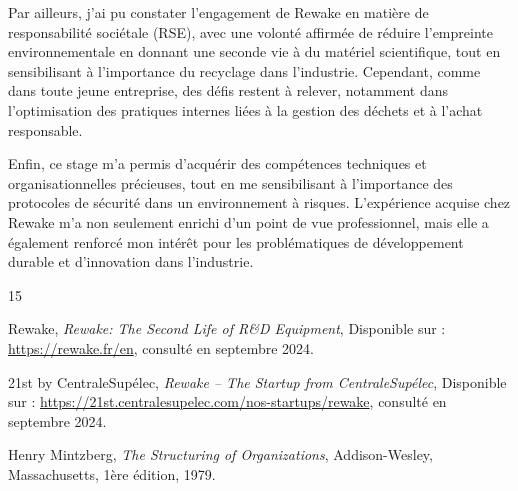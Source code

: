 \documentclass{rapportENSCP}
\begin{document}
Par ailleurs, j’ai pu constater l’engagement de Rewake en matière de responsabilité sociétale (RSE), avec une volonté affirmée de réduire l’empreinte environnementale en donnant une seconde vie à du matériel scientifique, tout en sensibilisant à l’importance du recyclage dans l’industrie. Cependant, comme dans toute jeune entreprise, des défis restent à relever, notamment dans l’optimisation des pratiques internes liées à la gestion des déchets et à l'achat responsable.

Enfin, ce stage m'a permis d'acquérir des compétences techniques et organisationnelles précieuses, tout en me sensibilisant à l’importance des protocoles de sécurité dans un environnement à risques. L’expérience acquise chez Rewake m'a non seulement enrichi d’un point de vue professionnel, mais elle a également renforcé mon intérêt pour les problématiques de développement durable et d'innovation dans l'industrie.

\begin{thebibliography}{15} %

Rewake, 
\emph{Rewake: The Second Life of R\&D Equipment}, 
Disponible sur : \url{https://rewake.fr/en}, consulté en septembre 2024.

21st by CentraleSupélec, 
\emph{Rewake – The Startup from CentraleSupélec}, 
Disponible sur : \url{https://21st.centralesupelec.com/nos-startups/rewake}, consulté en septembre 2024.

Henry Mintzberg, 
\emph{The Structuring of Organizations}, 
Addison-Wesley, Massachusetts, 1ère édition, 1979.

\end{thebibliography}
\end{document}
